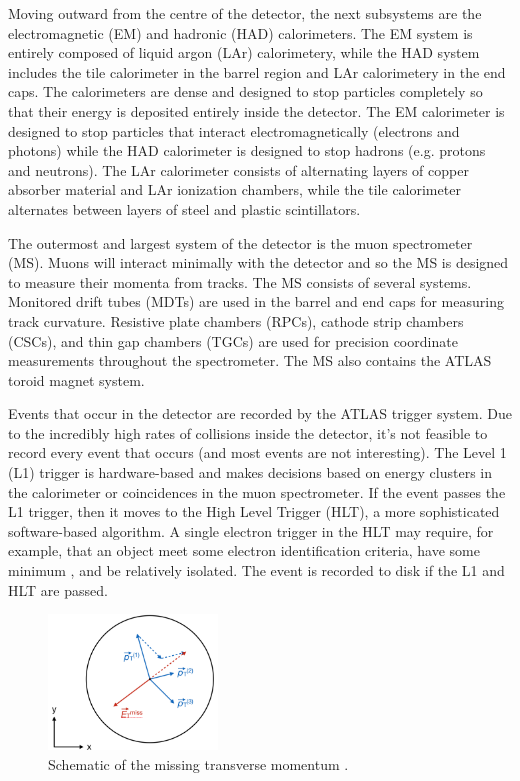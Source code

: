 Moving outward from the centre of the detector, the next subsystems are the electromagnetic (EM) and hadronic (HAD) calorimeters. The EM system is entirely composed of liquid argon (LAr) calorimetery, while the HAD system includes the tile calorimeter in the barrel region and LAr calorimetery in the end caps. The calorimeters are dense and designed to stop particles completely so that their energy is deposited entirely inside the detector. The EM calorimeter is designed to stop particles that interact electromagnetically (electrons and photons) while the HAD calorimeter is designed to stop hadrons (e.g. protons and neutrons). The LAr calorimeter consists of alternating layers of copper absorber material and LAr ionization chambers, while the tile calorimeter alternates between layers of steel and plastic scintillators. 

The outermost and largest system of the detector is the muon spectrometer (MS). Muons will interact minimally with the detector and so the MS is designed to measure their momenta from tracks. The MS consists of several systems. Monitored drift tubes (MDTs) are used in the barrel and end caps for measuring track curvature. Resistive plate chambers (RPCs), cathode strip chambers (CSCs), and thin gap chambers (TGCs) are used for precision coordinate measurements throughout the spectrometer. The MS also contains the ATLAS toroid magnet system.

Events that occur in the detector are recorded by the ATLAS trigger system. Due to the incredibly high rates of collisions inside the detector, it's not feasible to record every event that occurs (and most events are not interesting). The Level 1 (L1) trigger is hardware-based and makes decisions based on energy clusters in the calorimeter or coincidences in the muon spectrometer. If the event passes the L1 trigger, then it moves to the High Level Trigger (HLT), a more sophisticated software-based algorithm. A single electron trigger in the HLT may require, for example, that an object meet some electron identification criteria, have some minimum \pt, and be relatively isolated. The event is recorded to disk if the L1 and HLT are passed.

\begin{figure}[!htb]
\centering
\includegraphics[width=0.4\textwidth]{Figures/etmiss.png}
\caption{Schematic of the missing transverse momentum \etmissvec.}
\label{fig:etmiss}
\end{figure}

